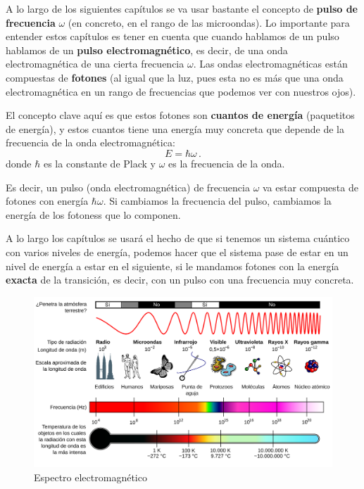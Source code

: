 A lo largo de los siguientes capítulos se va usar bastante el concepto de \textbf{pulso de frecuencia} $\omega$ (en concreto, en el rango de las microondas). Lo importante para entender estos capítulos es tener en cuenta que cuando hablamos de un pulso hablamos de un \textbf{pulso electromagnético}, es decir, de una onda electromagnética de una cierta frecuencia $\omega$. Las ondas electromagnéticas están compuestas de \textbf{fotones} (al igual que la luz, pues esta no es más que una onda electromagnética en un rango de frecuencias que podemos ver con nuestros ojos). 

El concepto clave aquí es que estos fotones son \textbf{cuantos de energía} (paquetitos de energía), y estos cuantos tiene una energía muy concreta que depende de la frecuencia de la onda electromagnética:
	\begin{equation} \label{ec_HW_E_hbar_omega}
	E = \hbar \omega \, .
	\end{equation}
donde $\hbar$ es la constante de Plack y $\omega$ es la frecuencia de la onda.

Es decir, un pulso (onda electromagnética) de frecuencia $\omega$ va estar compuesta de fotones con energía $\hbar \omega$. Si cambiamos la frecuencia del pulso, cambiamos la energía de los fotoness que lo componen. 

A lo largo los capítulos se usará el hecho de que si tenemos un sistema cuántico con varios niveles de energía, podemos hacer que el sistema pase de estar en un nivel de energía a estar en el siguiente, si le mandamos fotones con la energía \textbf{exacta} de la transición, es decir, con un pulso con una frecuencia muy concreta. 

    \begin{figure}[t]
      \centering 
      \includegraphics[width=1\linewidth]{Figuras/Fig_Hardware_espectro_electromagnetico.png}
      \caption{Espectro electromagnético}
      \label{Fig_Hardware_espectro_electromagnetico}
    \end{figure}
    	



